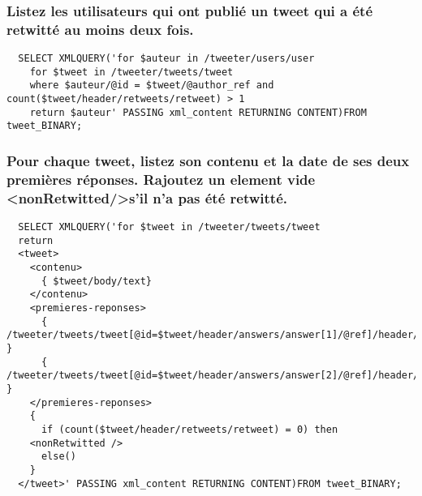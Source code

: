 \subsubsection{Listez les utilisateurs qui ont publié un tweet qui a été retwitté au moins deux fois.}
\begin{verbatim}
  SELECT XMLQUERY('for $auteur in /tweeter/users/user
    for $tweet in /tweeter/tweets/tweet
    where $auteur/@id = $tweet/@author_ref and count($tweet/header/retweets/retweet) > 1
    return $auteur' PASSING xml_content RETURNING CONTENT)FROM tweet_BINARY;
\end{verbatim}

\subsubsection{Pour chaque tweet, listez son contenu et la date de ses deux premières réponses. Rajoutez un element vide \textless nonRetwitted/\textgreater s’il n’a pas été retwitté.}
\begin{verbatim}
  SELECT XMLQUERY('for $tweet in /tweeter/tweets/tweet
  return
  <tweet>
    <contenu>
      { $tweet/body/text}
    </contenu>
    <premieres-reponses>
      { /tweeter/tweets/tweet[@id=$tweet/header/answers/answer[1]/@ref]/header/date }
      { /tweeter/tweets/tweet[@id=$tweet/header/answers/answer[2]/@ref]/header/date }
    </premieres-reponses>
    {
      if (count($tweet/header/retweets/retweet) = 0) then
	<nonRetwitted />
      else()
    }
  </tweet>' PASSING xml_content RETURNING CONTENT)FROM tweet_BINARY;
\end{verbatim}
